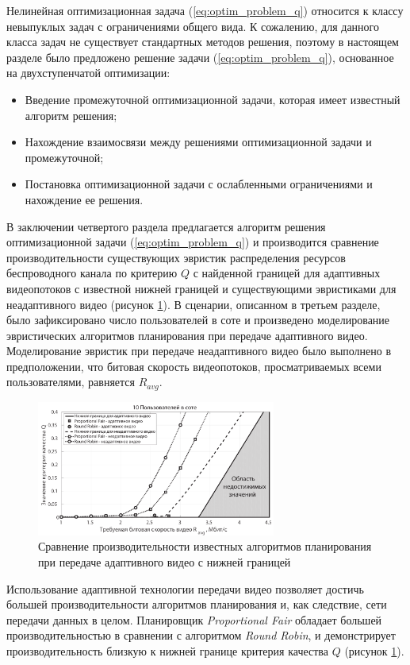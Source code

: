 Нелинейная оптимизационная задача (\ref{eq:optim_problem_q}) относится к классу невыпуклых задач с ограничениями общего вида. К сожалению, для данного класса задач не существует стандартных методов решения, поэтому в настоящем разделе было предложено решение задачи (\ref{eq:optim_problem_q}), основанное на двухступенчатой оптимизации:
\begin{itemize}
	\item Введение промежуточной оптимизационной задачи, которая имеет известный алгоритм решения;
	\item Нахождение взаимосвязи между решениями оптимизационной задачи и промежуточной;
	\item Постановка оптимизационной задачи с ослабленными ограничениями и нахождение ее решения.
\end{itemize}
В заключении четвертого раздела предлагается алгоритм решения оптимизационной задачи (\ref{eq:optim_problem_q}) и производится сравнение производительности существующих эвристик распределения ресурсов беспроводного канала по критерию $Q$ с найденной границей для адаптивных видеопотоков с известной нижней границей и существующими эвристиками для неадаптивного видео (рисунок \ref{fig:Q_PLOT}). В сценарии, описанном в третьем разделе, было зафиксировано число пользователей в соте и произведено моделирование эвристических алгоритмов планирования при передаче адаптивного видео. Моделирование эвристик при передаче неадаптивного видео было выполнено в предположении, что битовая скорость видеопотоков, просматриваемых всеми пользователями, равняется $R_{avg}$.

\begin{figure}[H]
\begin{center}
\includegraphics[width=0.7\textwidth]{../Dissertation/images/Chapter4/10_Users_v2.pdf}
\caption{Сравнение производительности известных алгоритмов планирования при передаче адаптивного видео с нижней границей}
\label{fig:Q_PLOT}
\end{center}
\end{figure}
Использование адаптивной технологии передачи видео позволяет достичь большей производительности алгоритмов планирования и, как следствие, сети передачи данных в целом. Планировщик \textit{Proportional Fair} обладает большей производительностью в сравнении с алгоритмом \textit{Round Robin}, и демонстрирует производительность близкую к нижней границе критерия качества $Q$ (рисунок \ref{fig:Q_PLOT}).

